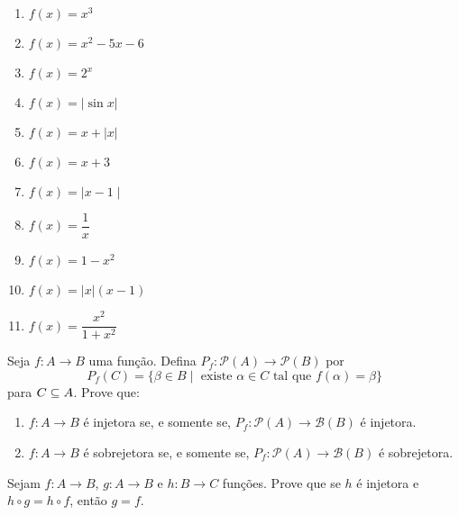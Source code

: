 \documentclass[12pt]{exam}
\begin{document}
    \begin{multicols}{2}
        \begin{enumerate}[label={\alph*})]
            \item $f(x) = x^3$

            \item $f(x) = x^2 - 5x - 6$

            \item $f(x) = 2^x$

            \item $f(x) = | \sin x |$

            \item $f(x) = x + | x |$

            \item $f(x) = x + 3$

            \item $f(x) = \mid x - 1\mid$

            \item $f(x) = \dfrac{1}{x}$

            \item $f(x) = 1 - x^2$

            \item $f(x) = |x|(x - 1)$

            \item $f(x) = \dfrac{x^2}{1 + x^2}$
        \end{enumerate}
    \end{multicols}

    \vspace{.3cm}

    \questao{} Seja $f : A \to B$ uma função. Defina $P_f : \mathcal{P}(A) \to \mathcal{P}(B)$ por
    \[
        P_f(C) = \{\beta \in B \mid \mbox{ existe } \alpha \in C \mbox{ tal que } f(\alpha) = \beta\}
    \]
    para $C \subseteq A$. Prove que:
    \begin{enumerate}[label={\roman*})]

        \item $f : A \to B$ é injetora se, e somente se, $P_f : \mathcal{P}(A) \to \mathcal{B}(B)$ é injetora.

        \item $f : A \to B$ é sobrejetora se, e somente se, $P_f : \mathcal{P}(A) \to \mathcal{B}(B)$ é sobrejetora.
    \end{enumerate}

    \vspace{.3cm}

    \questao{} Sejam $f : A \to B$, $g : A \to B$ e $h : B \to C$ fun\c{c}\~oes. Prove que se $h$ \'e injetora e $h \circ g = h \circ f$, ent\~ao $g = f$.
\end{document}
